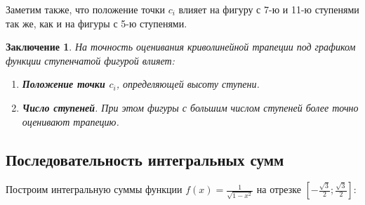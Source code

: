 \documentclass[12pt, a4paper]{article}
\newtheorem*{finish}{Заключение}
\begin{document}
Заметим также, что положение точки $c_i$ влияет на фигуру с 7-ю и 11-ю ступенями так же, как и на фигуры с 5-ю ступенями.

\begin{finish}
На точность оценивания криволинейной трапеции под графиком функции ступенчатой фигурой влияет:
\begin{enumerate}
\item \textbf{Положение точки $c_i$}, определяющей высоту ступени.
\item \textbf{Число ступеней}. При этом фигуры с большим числом ступеней более точно оценивают трапецию.
\end{enumerate}
\end{finish}
\subsection{Последовательность интегральных сумм}
Построим интегральную суммы функции $f(x) = \frac{1}{\sqrt{1-x^2}}$ на отрезке $\left[-\frac{\sqrt{3}}{2};\frac{\sqrt{3}}{2}\right]$:
\end{document}
